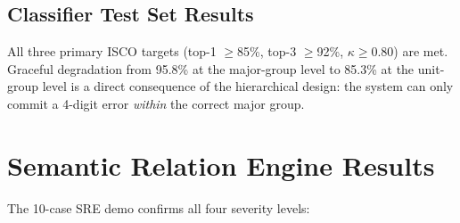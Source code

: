 \subsection{Classifier Test Set Results}

\begin{table}[htbp]
\centering
\caption{ISCO-08 accuracy by hierarchy level on 1,200-example Classifier Test Set.}
\label{tab:ch6-accuracy}
\small\renewcommand{\arraystretch}{1.35}
\end{table}

All three primary ISCO targets (top-1 $\geq$85\%, top-3 $\geq$92\%, $\kappa \geq 0.80$)
are met.
Graceful degradation from 95.8\% at the major-group level to 85.3\% at the
unit-group level is a direct consequence of the hierarchical design: the system
can only commit a 4-digit error \textit{within} the correct major group.

\section{Semantic Relation Engine Results}
\label{sec:res-sre}

The 10-case SRE demo confirms all four severity levels:

